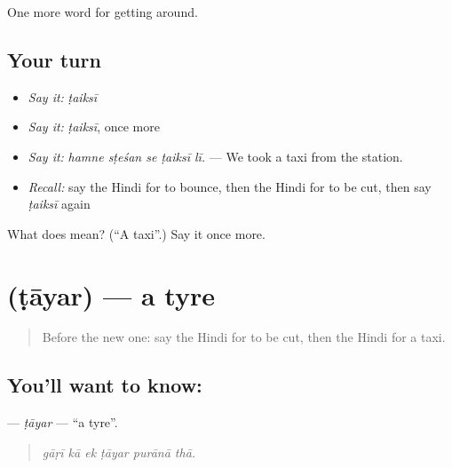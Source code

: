\begin{grammarlens}[title={What you've built}]
One more word for getting around.
\end{grammarlens}

\subsection*{Your turn}
\begin{itemize}
\raggedright
  \item \emph{Say it:} \emph{ṭaiksī}
  \item \emph{Say it:} \emph{ṭaiksī}, once more
  \item \emph{Say it:} \emph{hamne sṭeśan se ṭaiksī lī.} — We took a taxi from the station.
  \item \emph{Recall:} say the Hindi for to bounce, then the Hindi for to be cut, then say \emph{ṭaiksī} again
\end{itemize}

\begin{tcolorbox}[breakable,colback=teal!4,colframe=teal!35!black,title={Before you move on}]
What does  mean? (\textquotedblleft{}A taxi\textquotedblright{}.) Say it once more.
\end{tcolorbox}
\section[\texorpdfstring{\hi{टायर} (ṭāyar)}{टायर (ṭāyar)}]{ (ṭāyar) — a tyre}

\label{lesson:HI-C406-tayar}



\begin{quote}
Before the new one: say the Hindi for to be cut, then the Hindi for a taxi.
\end{quote}

\subsection*{You'll want to know: }
\textbf{} — \emph{ṭāyar} — \textquotedblleft{}a tyre\textquotedblright{}.

\begin{quote}
     
\end{quote}

\begin{quote}
\emph{gāṛī kā ek ṭāyar purānā thā.}
\end{quote}

